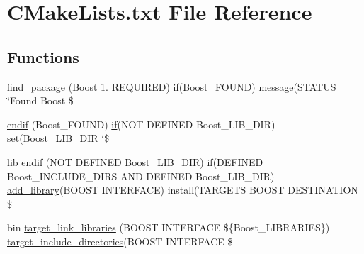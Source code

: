 \hypertarget{3rd__party_2Boost__dependency_2CMakeLists_8txt}{}\section{C\+Make\+Lists.\+txt File Reference}
\label{3rd__party_2Boost__dependency_2CMakeLists_8txt}
\subsection*{Functions}
\begin{DoxyCompactItemize}
\item 
\hyperlink{3rd__party_2Boost__dependency_2CMakeLists_8txt_a09e553c496218f39a0eaee39ae118c6a}{find\+\_\+package} (Boost 1. R\+E\+Q\+U\+I\+R\+ED) \hyperlink{3rd__party_2OCC__dependency_2CMakeLists_8txt_a64a7251a2d6c5f84ee98be006734e24f}{if}(Boost\+\_\+\+F\+O\+U\+ND) message(S\+T\+A\+T\+US \char`\"{}Found Boost \$
\item 
\hyperlink{3rd__party_2Boost__dependency_2CMakeLists_8txt_a66950d85e3ec23c90f07b9b9b6de6fe1}{endif} (Boost\+\_\+\+F\+O\+U\+ND) \hyperlink{3rd__party_2OCC__dependency_2CMakeLists_8txt_a64a7251a2d6c5f84ee98be006734e24f}{if}(N\+OT D\+E\+F\+I\+N\+ED Boost\+\_\+\+L\+I\+B\+\_\+\+D\+IR) \hyperlink{3rd__party_2OCC__dependency_2CMakeLists_8txt_a074553c33956a239810d7affac62c071}{set}(Boost\+\_\+\+L\+I\+B\+\_\+\+D\+IR \char`\"{}\$
\item 
lib \hyperlink{3rd__party_2Boost__dependency_2CMakeLists_8txt_a1c67195fe1ddac149b1d965678b4217a}{endif} (N\+OT D\+E\+F\+I\+N\+ED Boost\+\_\+\+L\+I\+B\+\_\+\+D\+IR) \hyperlink{3rd__party_2OCC__dependency_2CMakeLists_8txt_a64a7251a2d6c5f84ee98be006734e24f}{if}(D\+E\+F\+I\+N\+ED Boost\+\_\+\+I\+N\+C\+L\+U\+D\+E\+\_\+\+D\+I\+RS A\+ND D\+E\+F\+I\+N\+ED Boost\+\_\+\+L\+I\+B\+\_\+\+D\+IR) \hyperlink{Interface_2tools_2CMakeLists_8txt_a0ce3217fef9c2b9a0d23a3b8db43f787}{add\+\_\+library}(B\+O\+O\+ST I\+N\+T\+E\+R\+F\+A\+CE) install(T\+A\+R\+G\+E\+TS B\+O\+O\+ST D\+E\+S\+T\+I\+N\+A\+T\+I\+ON \$
\item 
bin \hyperlink{3rd__party_2Boost__dependency_2CMakeLists_8txt_a497ccbba6ff6df2ce1c4b839efbc42b9}{target\+\_\+link\+\_\+libraries} (B\+O\+O\+ST I\+N\+T\+E\+R\+F\+A\+CE \$\{Boost\+\_\+\+L\+I\+B\+R\+A\+R\+I\+ES\}) \hyperlink{3rd__party_2OCC__dependency_2CMakeLists_8txt_a7716dc48bda2b99d9e8cb80298ce1ce6}{target\+\_\+include\+\_\+directories}(B\+O\+O\+ST I\+N\+T\+E\+R\+F\+A\+CE \$
\end{DoxyCompactItemize}


